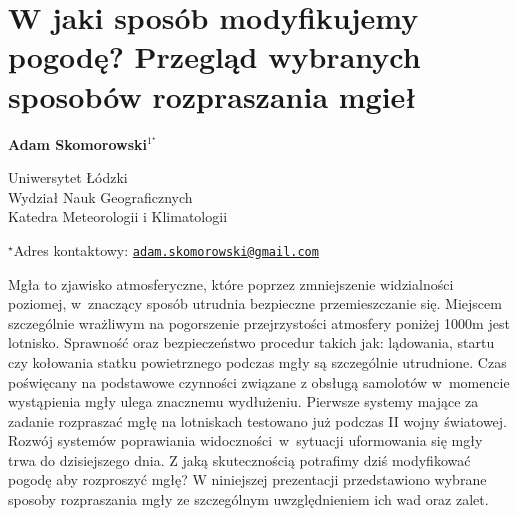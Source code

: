 \documentclass[\main/boa.tex]{subfiles}
\begin{document}
\section{W jaki sposób modyfikujemy pogodę? Przegląd wybranych sposobów rozpraszania mgieł}

\begin{center}
  {\bf {} Adam Skomorowski$^{1^\star}$}
\end{center}

\vskip 0.3cm

\begin{affiliations}
\begin{enumerate}
\begin{minipage}{0.915\textwidth}
\centering
\item Uniwersytet Łódzki \\ Wydział Nauk Geograficznych \\ Katedra Meteorologii i Klimatologii\\[-2pt]
\end{minipage}
\end{enumerate}
$^\star$Adres kontaktowy: \href{mailto:adam.skomorowski@gmail.com}{\nolinkurl{adam.skomorowski@gmail.com}}\\
\end{affiliations}

\vskip 0.5cm


\vskip 0.5cm

Mgła to zjawisko atmosferyczne, które poprzez zmniejszenie widzialności poziomej, w znaczący sposób utrudnia bezpieczne przemieszczanie się. Miejscem szczególnie wrażliwym na pogorszenie przejrzystości atmosfery poniżej 1000m jest lotnisko. Sprawność oraz bezpieczeństwo procedur takich jak: lądowania, startu czy kołowania statku powietrznego podczas mgły są szczególnie utrudnione. Czas poświęcany na podstawowe czynności związane z obsługą samolotów w momencie wystąpienia mgły ulega znacznemu wydłużeniu. Pierwsze systemy mające za zadanie rozpraszać mgłę na lotniskach testowano już podczas II wojny światowej. Rozwój systemów poprawiania widoczności~w~sytuacji uformowania się mgły trwa do dzisiejszego dnia. Z jaką skutecznością potrafimy dziś modyfikować pogodę aby rozproszyć mgłę? W niniejszej prezentacji przedstawiono wybrane sposoby rozpraszania mgły ze szczególnym uwzględnieniem ich wad oraz zalet.
\end{document}

